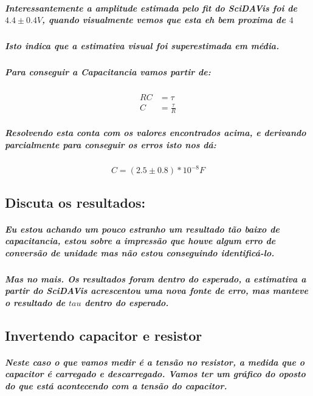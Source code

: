 \documentclass[12pt,twoside, a4paper, twocolumn]{article}
\begin{document}
\subparagraph*{Interessantemente a amplitude estimada pelo fit do SciDAVis foi de $4.4 \pm 0.4V$, quando visualmente vemos que esta eh bem proxima de $4$ }

\subparagraph*{Isto indica que a estimativa visual foi superestimada em média.}

\subparagraph*{Para conseguir a Capacitancia vamos partir de:}

\begin{equation}
    \begin{aligned}
        RC & = \tau           \\
        C  & = \frac{\tau}{R}
    \end{aligned}
\end{equation}

\subparagraph*{Resolvendo esta conta com os valores encontrados acima, e derivando parcialmente para conseguir os erros isto nos dá:}

\begin{equation*}
    C = (2.5  \pm 0.8) * 10^{-8} F
\end{equation*}

\subsection{Discuta os resultados:}

\subparagraph*{Eu estou achando um pouco estranho um resultado tão baixo de capacitancia, estou sobre a impressão que houve algum erro de conversão de unidade mas não estou conseguindo identificá-lo.}

\subparagraph*{Mas no mais. Os resultados foram dentro do esperado, a estimativa a partir do SciDAVis acrescentou uma nova fonte de erro, mas manteve o resultado de $tau$ dentro do esperado.}

\subsection{Invertendo capacitor e resistor}

\subparagraph*{Neste caso o que vamos medir é a tensão no resistor, a medida que o capacitor é carregado e descarregado. Vamos ter um gráfico do oposto do que está acontecendo com a tensão do capacitor.}

\clearpage
\end{document}
